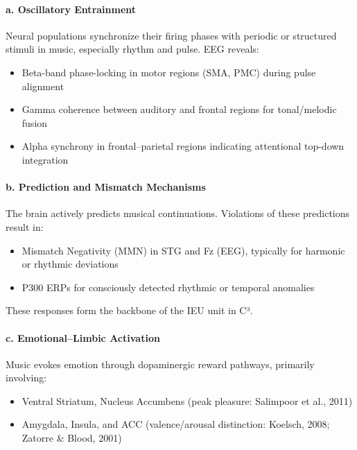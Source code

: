 \paragraph{a. Oscillatory Entrainment}

Neural populations synchronize their firing phases with periodic or structured stimuli in music, especially rhythm and pulse. EEG reveals:

\begin{itemize}
    \item Beta-band phase-locking in motor regions (SMA, PMC) during pulse alignment
    \item Gamma coherence between auditory and frontal regions for tonal/melodic fusion
    \item Alpha synchrony in frontal–parietal regions indicating attentional top-down integration
\end{itemize}

\paragraph{b. Prediction and Mismatch Mechanisms}

The brain actively predicts musical continuations. Violations of these predictions result in:

\begin{itemize}
    \item Mismatch Negativity (MMN) in STG and Fz (EEG), typically for harmonic or rhythmic deviations
    \item P300 ERPs for consciously detected rhythmic or temporal anomalies
\end{itemize}

These responses form the backbone of the IEU unit in C³.

\paragraph{c. Emotional–Limbic Activation}

Music evokes emotion through dopaminergic reward pathways, primarily involving:

\begin{itemize}
    \item Ventral Striatum, Nucleus Accumbens (peak pleasure: Salimpoor et al., 2011)
    \item Amygdala, Insula, and ACC (valence/arousal distinction: Koelsch, 2008; Zatorre \& Blood, 2001)
\end{itemize}

